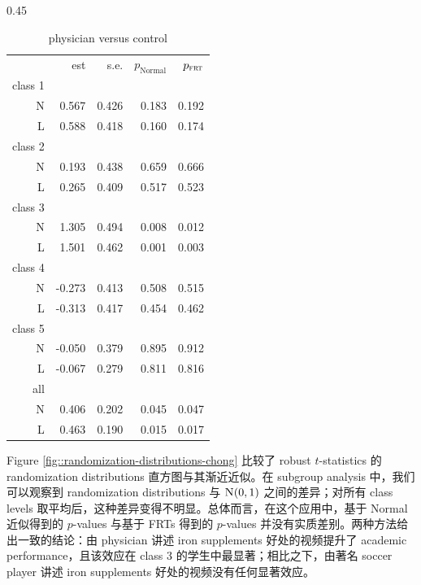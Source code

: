 \begin{table}
\begin{subtable}[h]{0.45\textwidth} 
\caption{physician versus control}
    \begin{tabular}{rrrrr}
    \hline 
   &    est & s.e. &$p_\text{Normal}$ & $p_{\textsc{frt}}$ \\
       class 1& &&&\\
\textsc{N}  &  0.567 &0.426  &    0.183 &  0.192 \\
\textsc{L}   &   0.588& 0.418  &   0.160  & 0.174 \\
       class 2& &&&\\
\textsc{N}  &   0.193& 0.438 &     0.659 &  0.666 \\
\textsc{L}   &  0.265& 0.409   &   0.517  & 0.523 \\
       class 3& &&&\\
\textsc{N}  &  1.305& 0.494  &    0.008 &  0.012\\
\textsc{L}   &  1.501& 0.462   &   0.001  & 0.003 \\
       class 4& &&&\\
\textsc{N}  &  -0.273& 0.413  &    0.508 &  0.515 \\
\textsc{L}   &  -0.313& 0.417   &   0.454  & 0.462\\
       class 5& &&&\\
\textsc{N}  & -0.050 &0.379  &    0.895 &  0.912 \\
\textsc{L}   &  -0.067& 0.279  &    0.811 &  0.816 \\
       all& &&&\\
\textsc{N}  &  0.406 & 0.202   &   0.045 &  0.047\\
\textsc{L}   &    0.463 & 0.190   &   0.015  & 0.017 \\
\hline 
    \end{tabular}
\end{subtable}
\end{table}

Figure \ref{fig::randomization-distributions-chong} 比较了 robust $t$-statistics 的 randomization distributions 直方图与其渐近近似。在 subgroup analysis 中，我们可以观察到 randomization distributions 与 $\textsc{N}(0,1)$ 之间的差异；对所有 class levels 取平均后，这种差异变得不明显。总体而言，在这个应用中，基于 Normal 近似得到的 $p$-values 与基于 FRTs 得到的 $p$-values 并没有实质差别。两种方法给出一致的结论：由 physician 讲述 iron supplements 好处的视频提升了 academic performance，且该效应在 class 3 的学生中最显著；相比之下，由著名 soccer player 讲述 iron supplements 好处的视频没有任何显著效应。

